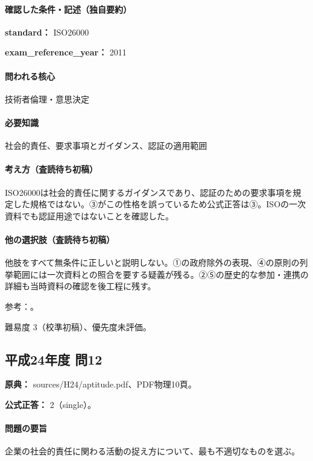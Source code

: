 \paragraph{確認した条件・記述（独自要約）}\mbox{}\par

\noindent\textbf{standard：} ISO26000\par

\noindent\textbf{exam\_reference\_year：} 2011\par

\paragraph{問われる核心} 技術者倫理・意思決定

\paragraph{必要知識} 社会的責任、要求事項とガイダンス、認証の適用範囲

\paragraph{考え方（査読待ち初稿）} ISO26000は社会的責任に関するガイダンスであり、認証のための要求事項を規定した規格ではない。③がこの性格を誤っているため公式正答は③。ISOの一次資料でも認証用途ではないことを確認した。

\paragraph{他の選択肢（査読待ち初稿）} 他肢をすべて無条件に正しいと説明しない。①の政府除外の表現、④の原則の列挙範囲には一次資料との照合を要する疑義が残る。②⑤の歴史的な参加・連携の詳細も当時資料の確認を後工程に残す。

\par 参考：\cite{iso26000}。

\par 難易度 3（校準初稿）、優先度未評価。

\subsection{平成24年度 問12}
\label{q:h24-reg-apt-12}

\noindent\textbf{原典：} sources/H24/aptitude.pdf、PDF物理10頁。

\textbf{公式正答：} 2（single）。

\paragraph{問題の要旨} 企業の社会的責任に関わる活動の捉え方について、最も不適切なものを選ぶ。

